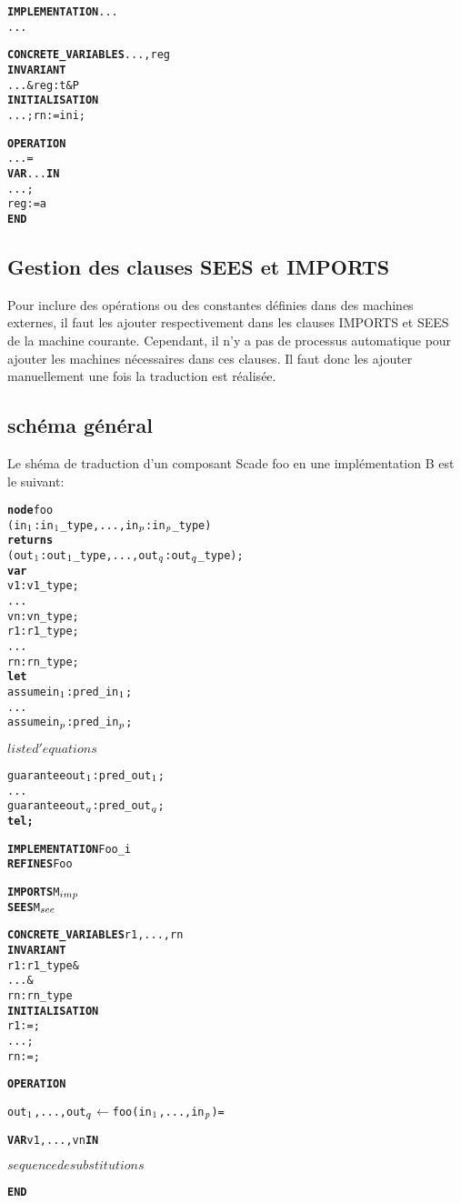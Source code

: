 \begin{alltt}
\textbf{IMPLEMENTATION} ...
...

\textbf{CONCRETE\_VARIABLES} ..., reg
\textbf{INVARIANT}
  ...& reg : t & P
\textbf{INITIALISATION}
  ... ; rn := ini;

\textbf{OPERATION}
... =
\textbf{VAR} ... \textbf{IN}
  ...;
  reg := a
\textbf{END}
\end{alltt}

\subsection{Gestion des clauses SEES et IMPORTS}
Pour inclure des opérations ou des constantes définies dans des machines
externes, il faut les ajouter respectivement dans les clauses IMPORTS et SEES de
la machine courante. Cependant, il n'y a pas de processus automatique pour
ajouter les machines nécessaires dans ces clauses. Il faut donc les ajouter
manuellement une fois la traduction est réalisée.


\subsection{schéma général}

Le shéma de traduction d'un composant Scade foo en une implémentation B est
le suivant:


\setlength{\columnseprule}{0.05cm}
\begin{multicols}{2}
\begin{alltt}
\textbf{node} foo 
  (in\(\sb{1}\): in\(\sb{1}\)\_type, ..., in\(\sb{p}\): in\(\sb{p}\)\_type) 
  \textbf{returns}
  (out\(\sb{1}\): out\(\sb{1}\)\_type, ..., out\(\sb{q}\): out\(\sb{q}\)\_type);
\textbf{var}
  v1 : v1\_type;
  ...
  vn : vn\_type;
  r1 : r1\_type;
  ...
  rn : rn\_type;
\textbf{let}
  assume in\(\sb{1}\) : pred\_in\(\sb{1}\);
  ...
  assume in\(\sb{p}\) : pred\_in\(\sb{p}\);

  \(liste d'equations\)

  guarantee out\(\sb{1}\) : pred\_out\(\sb{1}\);
  ...
  guarantee out\(\sb{q}\) : pred\_out\(\sb{q}\);
\textbf{tel;}
\end{alltt}

\columnbreak

\begin{alltt}
\textbf{IMPLEMENTATION} Foo_i
\textbf{REFINES} Foo

\textbf{IMPORTS} M\(\sb{imp}\)
\textbf{SEES} M\(\sb{see}\)

\textbf{CONCRETE\_VARIABLES} r1, ..., rn
\textbf{INVARIANT}
  r1 : r1\_type &
  ... &
  rn : rn\_type
\textbf{INITIALISATION}
  r1 := ;
  ... ;
  rn := ;

\textbf{OPERATION}

out\(\sb{1}\), ..., out\(\sb{q}\) \(\leftarrow\) foo(in\(\sb{1}\), ..., in\(\sb{p}\)) =
  
\textbf{VAR} v1, ..., vn \textbf{IN}
  
  \(sequence de substitutions\)

\textbf{END}
\end{alltt}
\end{multicols}

